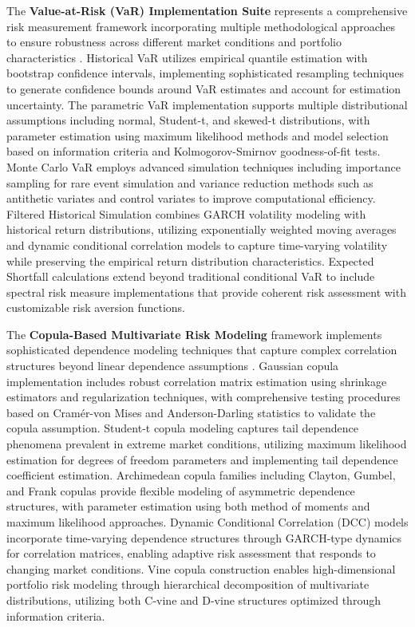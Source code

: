 \documentclass[12pt,a4paper]{article}
\theoremstyle{definition}
\theoremstyle{remark}
\begin{document}
The \textbf{Value-at-Risk (VaR) Implementation Suite} represents a comprehensive risk measurement framework incorporating multiple methodological approaches to ensure robustness across different market conditions and portfolio characteristics \citep{jorion2007value}. Historical VaR utilizes empirical quantile estimation with bootstrap confidence intervals, implementing sophisticated resampling techniques to generate confidence bounds around VaR estimates and account for estimation uncertainty. The parametric VaR implementation supports multiple distributional assumptions including normal, Student-t, and skewed-t distributions, with parameter estimation using maximum likelihood methods and model selection based on information criteria and Kolmogorov-Smirnov goodness-of-fit tests. Monte Carlo VaR employs advanced simulation techniques including importance sampling for rare event simulation and variance reduction methods such as antithetic variates and control variates to improve computational efficiency. Filtered Historical Simulation combines GARCH volatility modeling with historical return distributions, utilizing exponentially weighted moving averages and dynamic conditional correlation models to capture time-varying volatility while preserving the empirical return distribution characteristics. Expected Shortfall calculations extend beyond traditional conditional VaR to include spectral risk measure implementations that provide coherent risk assessment with customizable risk aversion functions.

The \textbf{Copula-Based Multivariate Risk Modeling} framework implements sophisticated dependence modeling techniques that capture complex correlation structures beyond linear dependence assumptions \citep{mcneil2015quantitative}. Gaussian copula implementation includes robust correlation matrix estimation using shrinkage estimators and regularization techniques, with comprehensive testing procedures based on Cramér-von Mises and Anderson-Darling statistics to validate the copula assumption. Student-t copula modeling captures tail dependence phenomena prevalent in extreme market conditions, utilizing maximum likelihood estimation for degrees of freedom parameters and implementing tail dependence coefficient estimation. Archimedean copula families including Clayton, Gumbel, and Frank copulas provide flexible modeling of asymmetric dependence structures, with parameter estimation using both method of moments and maximum likelihood approaches. Dynamic Conditional Correlation (DCC) models incorporate time-varying dependence structures through GARCH-type dynamics for correlation matrices, enabling adaptive risk assessment that responds to changing market conditions. Vine copula construction enables high-dimensional portfolio risk modeling through hierarchical decomposition of multivariate distributions, utilizing both C-vine and D-vine structures optimized through information criteria.
\end{document}

